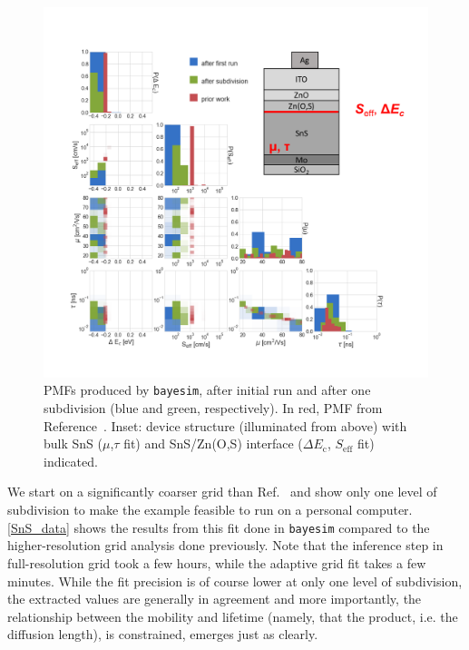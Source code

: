 \documentclass[aps,prl,amsmath,amssymb,superscriptaddress,notitlepage,groupedaddress]{revtex4-1}
\begin{document}
    \begin{figure}
      \includegraphics[width=0.8\columnwidth]{figure_4.png}
      \caption{PMFs produced by \texttt{bayesim}, after initial run and after one subdivision (blue and green, respectively). In red, PMF from Reference~\cite{SnSJoule}. Inset: device structure (illuminated from above) with bulk SnS ($\mu$,$\tau$ fit) and SnS/Zn(O,S) interface ($\Delta E_\text{c}$, $S_{\text{eff}}$ fit) indicated.}
      \label{SnS_data}
    \end{figure}

    We start on a significantly coarser grid than Ref.~\cite{SnSJoule} and show only one level of subdivision to make the example feasible to run on a personal computer. \autoref{SnS_data} shows the results from this fit done in \texttt{bayesim} compared to the higher-resolution grid analysis done previously. Note that the inference step in full-resolution grid took a few hours, while the adaptive grid fit takes a few minutes. While the fit precision is of course lower at only one level of subdivision, the extracted values are generally in agreement and more importantly, the relationship between the mobility and lifetime (namely, that the product, i.e. the diffusion length), is constrained, emerges just as clearly.
\end{document}
